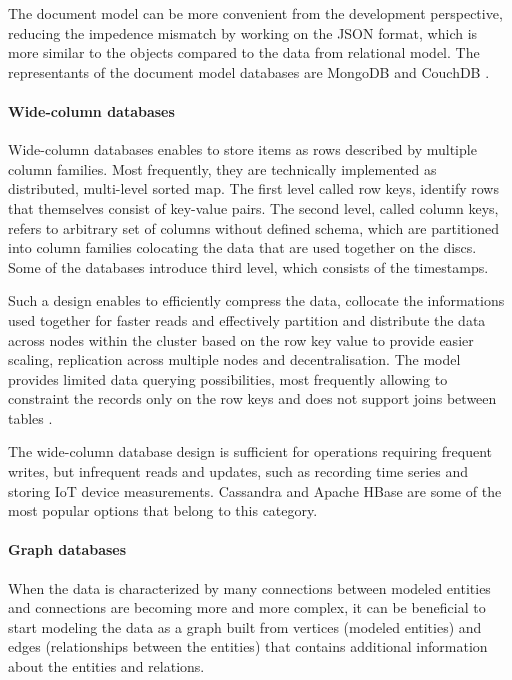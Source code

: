 The document model can be more convenient from the development perspective, reducing the impedence mismatch by working on the JSON format, which is more similar to the objects compared to the data from relational model. The representants of the document model databases are MongoDB \cite{MongoDB} and CouchDB \cite{CouchDB}.

\paragraph*{Wide-column databases}

Wide-column databases enables to store items as rows described by multiple column families. Most frequently, they are technically implemented as distributed, multi-level sorted map. The first level called row keys, identify rows that themselves consist of key-value pairs. The second level, called column keys, refers to arbitrary set of columns without defined schema, which are partitioned into column families colocating the data that are used together on the discs. Some of the databases introduce third level, which consists of the timestamps.

Such a design enables to efficiently compress the data, collocate the informations used together for faster reads and effectively partition and distribute the data across nodes within the cluster based on the row key value to provide easier scaling, replication across multiple nodes and decentralisation. The model provides limited data querying possibilities, most frequently allowing to constraint the records only on the row keys and does not support joins between tables \cite{NoSQLDatabaseSystemsSurveyDecisionGuidance}.

The wide-column database design is sufficient for operations requiring frequent writes, but infrequent reads and updates, such as recording time series and storing IoT device measurements. Cassandra \cite{Cassandra} and Apache HBase \cite{HBase} are some of the most popular options that belong to this category.

\paragraph*{Graph databases}

When the data is characterized by many connections between modeled entities and connections are becoming more and more complex, it can be beneficial to start modeling the data as a graph built from vertices (modeled entities) and edges (relationships between the entities) that contains additional information about the entities and relations. 

